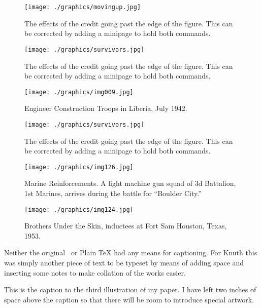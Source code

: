 \newpage
\pagestyle{empty}
\thispagestyle{empty}
\begin{figure}[htp]
\centering

\captionsetup{name=Photo., labelsep=period}%
   \begin{minipage}[t]{0.48\textwidth}%
      \texttt{[image: ./graphics/movingup.jpg]}%
     \caption{The effects of the credit going past the edge of the figure. This can be corrected by adding a minipage to hold both commands. }
\end{minipage}\hfill\hfill
\begin{minipage}[t]{0.48\textwidth}
      \texttt{[image: ./graphics/survivors.jpg]}%
     \caption{The effects of the credit going past the edge of the figure. This can be corrected by adding a minipage to hold both commands. }
\end{minipage}

 \begin{minipage}[t]{0.48\textwidth}
      \texttt{[image: ./graphics/img009.jpg]}%
     \caption{Engineer Construction Troops in Liberia, July 1942.}
\end{minipage}\hfill\hfill
\begin{minipage}[t]{0.48\textwidth}
      \texttt{[image: ./graphics/survivors.jpg]}%
     \caption{The effects of the credit going past the edge of the figure. This can be corrected by adding a minipage to hold both commands. }
\end{minipage}
 \begin{minipage}[t]{0.48\textwidth}
      \texttt{[image: ./graphics/img126.jpg]}%
     \caption{Marine Reinforcements.
A light machine gun squad of 3d Battalion, 1st Marines, arrives during the battle for ``Boulder City.'' }
\end{minipage}\hfill\hfill
\begin{minipage}[t]{0.48\textwidth}
      \texttt{[image: ./graphics/img124.jpg]}%
     \caption{Brothers Under the Skin, inductees at Fort Sam Houston, Texas, 1953. }
\end{minipage}
\end{figure}
\newpage

Neither the original \tex\ or Plain TeX had any means for captioning. For Knuth this was simply another piece of text to be typeset by means of adding space and inserting some notes to make collation of the works easier.

\begin{teXXX}
{\vskip 2in
\hsize=3in \raggedright
{} This is the caption to the
third illustration of my paper. I have left two inches
of space above the caption so that there will be room
to introduce special artwork.}
\end{teXXX}
\relax

\endinput